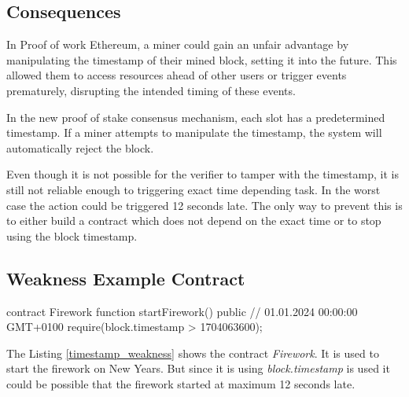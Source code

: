 \subsection{Consequences}

In Proof of work Ethereum, a miner could gain an unfair advantage by
manipulating the timestamp of their mined block, setting it into the future.
This allowed them to access resources ahead of other users or trigger events
prematurely, disrupting the intended timing of these events.

In the new proof of stake consensus mechanism, each slot has a predetermined
timestamp. If a miner attempts to manipulate the timestamp, the system will
automatically reject the block.

Even though it is not possible for the verifier to tamper with the timestamp,
it is still not reliable enough to triggering exact time depending task. In the
worst case the action could be triggered 12 seconds late. The only way to
prevent this is to either build a contract which does not depend on the exact
time or to stop using the block timestamp.

\subsection{Weakness Example Contract}

\begin{solidity}[caption=Weakness, label={timestamp_weakness}]
contract Firework {
  function startFirework() public {
    // 01.01.2024 00:00:00 GMT+0100
    require(block.timestamp > 1704063600);
  }
}
\end{solidity}
The Listing \ref{timestamp_weakness} shows the contract \textit{Firework}. It
is used to start the firework on New Years. But since it is using
\textit{block.timestamp} is used it could be possible that the firework started
at maximum 12 seconds late.

%
%

    
